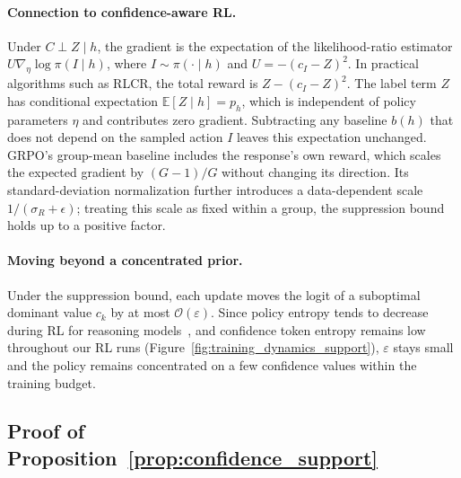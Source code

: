 \documentclass{article} %
\begin{document}
\paragraph{Connection to confidence-aware RL.}
Under $C \perp Z \mid h$, the gradient is the expectation of the likelihood-ratio estimator $U \nabla_\eta \log \pi(I \mid h)$, where $I \sim \pi(\cdot \mid h)$ and $U = -(c_I - Z)^2$.
In practical algorithms such as RLCR, the total reward is $Z - (c_I - Z)^2$.
The label term $Z$ has conditional expectation $\mathbb E[Z \mid h] = p_h$, which is independent of policy parameters $\eta$ and contributes zero gradient.
Subtracting any baseline $b(h)$ that does not depend on the sampled action $I$ leaves this expectation unchanged.
GRPO's group-mean baseline includes the response's own reward, which scales the expected gradient by $(G-1)/G$ without changing its direction.
Its standard-deviation normalization further introduces a data-dependent scale $1/(\sigma_R+\epsilon)$; treating this scale as fixed within a group, the suppression bound holds up to a positive factor.

\paragraph{Moving beyond a concentrated prior.}
Under the suppression bound, each update moves the logit of a suboptimal dominant value $c_k$ by at most $\mathcal O(\varepsilon)$.
Since policy entropy tends to decrease during RL for reasoning models~\citep{cui2025entropy}, and confidence token entropy remains low throughout our RL runs (Figure~\ref{fig:training_dynamics_support}), $\varepsilon$ stays small and the policy remains concentrated on a few confidence values within the training budget.
 

\subsection{Proof of Proposition~\ref{prop:confidence_support}}
\label{sec:confidence_support_proof}
\end{document}
